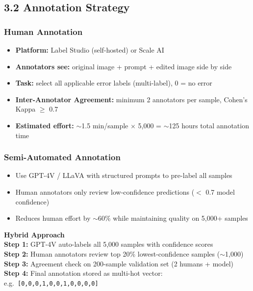 \documentclass[11pt,a4paper]{article}
\begin{document}
\subsection{3.2 Annotation Strategy}

\subsubsection*{Human Annotation}
\begin{itemize}[leftmargin=1.5em]
    \item \textbf{Platform:} Label Studio (self-hosted) or Scale AI
    \item \textbf{Annotators see:} original image + prompt + edited image side by side
    \item \textbf{Task:} select all applicable error labels (multi-label), 0 = no error
    \item \textbf{Inter-Annotator Agreement:} minimum 2 annotators per sample, Cohen's Kappa $\geq$ 0.7
    \item \textbf{Estimated effort:} $\sim$1.5 min/sample $\times$ 5,000 = $\sim$125 hours total annotation time
\end{itemize}

\subsubsection*{Semi-Automated Annotation}
\begin{itemize}[leftmargin=1.5em]
    \item Use GPT-4V / LLaVA with structured prompts to pre-label all samples
    \item Human annotators only review low-confidence predictions ($<$ 0.7 model confidence)
    \item Reduces human effort by $\sim$60\% while maintaining quality on 5,000+ samples
\end{itemize}

\begin{infobox}
\textbf{Hybrid Approach}\\[4pt]
\textbf{Step 1:} GPT-4V auto-labels all 5,000 samples with confidence scores\\
\textbf{Step 2:} Human annotators review top 20\% lowest-confidence samples ($\sim$1,000)\\
\textbf{Step 3:} Agreement check on 200-sample validation set (2 humans + model)\\
\textbf{Step 4:} Final annotation stored as multi-hot vector: e.g.\ \texttt{[0,0,0,1,0,0,1,0,0,0,0]}
\end{infobox}
\end{document}
